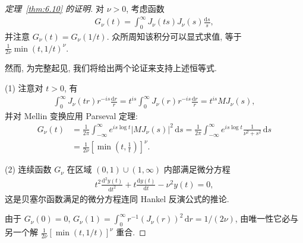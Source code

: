 \begin{proof}[定理~\ref{thm:6.10} 的证明]
对 $\nu > 0$, 考虑函数
\begin{align*}
  G_{\nu}(t)=\int_{0}^{\infty}J_{\nu}(t s)J_{\nu}(s)\frac{\mathrm{d}s}{s},
\end{align*}
并注意 $G_{\nu}(t) = G_{\nu}(1/t)$. 众所周知该积分可以显式求值, 等于 $\frac{1}{2\nu}\min(t,1/t)^{\nu}$.

然而, 为完整起见, 我们将给出两个论证来支持上述恒等式.

(1) 注意对 $t > 0$, 有
\begin{align*}
  \int_{0}^{\infty}J_{\nu}(t r)r^{-is}\frac{\mathrm{d}r}{r}
  =t^{is}\int_{0}^{\infty}J_{\nu}(r)r^{-is}\frac{\mathrm{d}r}{r}
  =t^{is}M J_{\nu}(s),
\end{align*}
并对 Mellin 变换应用 Parseval 定理:
\begin{align*}
  G_{\nu}(t)
  &=\frac{1}{2\pi}\int_{-\infty}^{\infty}e^{is\log t}\left|MJ_{\nu}(s)\right|^{2}\,\mathrm{d}s
  =\frac{1}{2\pi}\int_{-\infty}^{\infty}e^{is\log t}\frac{1}{\nu^{2}+s^{2}}\,\mathrm{d}s\\
  &=\frac{1}{2\nu}\left[\min\left(t,\frac{1}{t}\right)\right]^{\nu}.
\end{align*}

(2) 连续函数 $G_{\nu}$ 在区域 $(0,1) \cup (1,\infty)$ 内部满足微分方程
\begin{align*}
  t^{2}\frac{\mathrm{d}^{2}y(t)}{\mathrm{d}t^{2}}+t\frac{\mathrm{d}y(t)}{\mathrm{d}t}-\nu^{2}y(t)=0,
\end{align*}
这是贝塞尔函数满足的微分方程连同 Hankel 反演公式的推论.

由于 $G_{\nu}(0) = 0$, $G_{\nu}(1) = \int_{0}^{\infty} r^{-1}(J_{\nu}(r))^2\,\mathrm{d}r = 1/(2\nu)$, 由唯一性它必与另一个解 $\frac{1}{2\nu}[\min(t,1/t)]^\nu$ 重合.


\end{proof}

